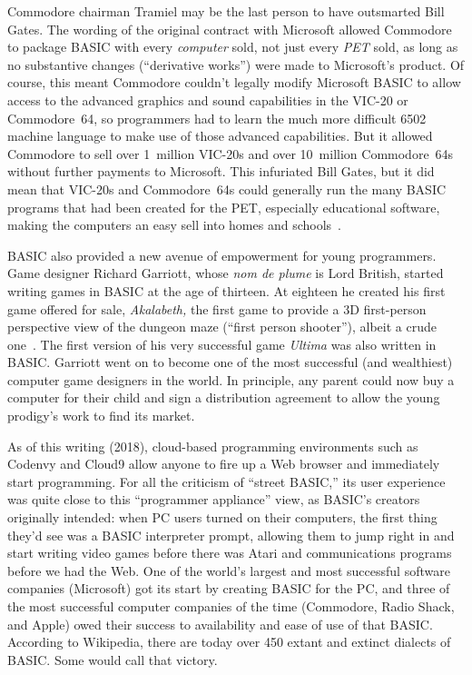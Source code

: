 Commodore chairman Tramiel may be the last person to have outsmarted
Bill Gates.
The wording of the original contract with Microsoft allowed Commodore
to package BASIC with every \emph{computer} sold, not just every
\emph{PET} sold, as long as no substantive changes (``derivative
works'') were made to Microsoft's product.
Of course, this meant Commodore couldn't legally modify Microsoft
BASIC to allow access to the advanced graphics and sound capabilities
in the VIC-20 or Commodore~64, so programmers had to learn the much
more difficult 6502 machine language to make use of those
advanced capabilities.
But it allowed Commodore to sell over 1~million VIC-20s and over
10~million Commodore~64s without further payments to Microsoft.
This infuriated Bill Gates, but it did mean that VIC-20s and
Commodore~64s could generally run the many BASIC programs that had
been created for the PET, especially educational software, making the
computers an easy sell into homes and
schools~\cite[p. 414]{commodore}.

BASIC also provided a new avenue of empowerment for young programmers.
Game designer Richard Garriott, whose \emph{nom de plume} is Lord
British, started writing games in BASIC at the age of thirteen.
At eighteen he created his first game offered for sale,
\emph{Akalabeth,} the first game to provide a 3D first-person
perspective view of the dungeon maze (``first person shooter''),
albeit a crude one~\cite{akalabeth}.
The first version of his very
successful game \emph{Ultima} was also written in BASIC.
Garriott went on to become one of the most successful (and wealthiest)
computer game designers in the world.
In principle, any parent could now buy a computer for their child and
sign a distribution agreement to allow the young prodigy's work to
find its market.

As of this writing (2018), cloud-based programming environments such
as Codenvy and Cloud9 allow anyone to fire up a Web browser and
immediately start programming.
For all the criticism of ``street BASIC,'' its user experience was
quite close to this ``programmer appliance'' view, as BASIC's creators
originally intended: when PC users turned on their computers, the
first thing they'd see was a BASIC interpreter prompt, allowing them
to jump right in and start writing video games before there was Atari
and communications programs before we had the Web.
One of the world's largest and most
successful software companies (Microsoft) got its start by creating
BASIC for the PC, and three of the most successful computer companies
of the time (Commodore, Radio Shack, and Apple) owed their success to
availability and ease of use of that BASIC.
According to Wikipedia, there are today over 450 extant and extinct
dialects of BASIC.
Some would call that victory.

